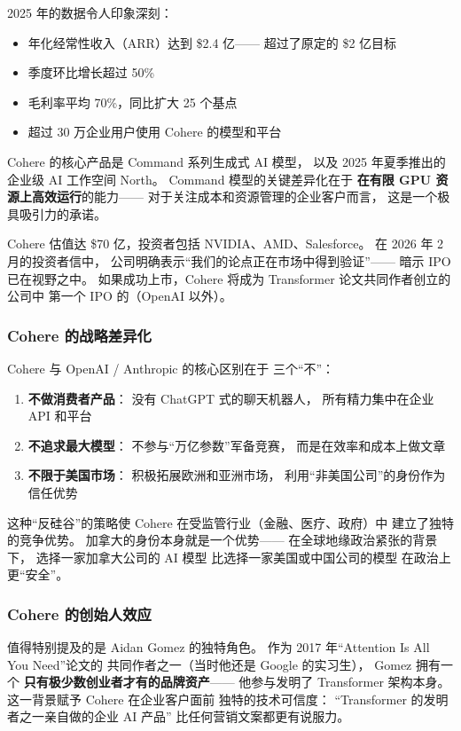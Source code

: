 2025 年的数据令人印象深刻：
\begin{itemize}[noitemsep]
  \item 年化经常性收入（ARR）达到 \$2.4 亿——
        超过了原定的 \$2 亿目标
  \item 季度环比增长超过 50\%
  \item 毛利率平均 70\%，同比扩大 25 个基点
  \item 超过 30 万企业用户使用 Cohere 的模型和平台
\end{itemize}

Cohere 的核心产品是 Command 系列生成式 AI 模型，
以及 2025 年夏季推出的企业级 AI 工作空间 North。
Command 模型的关键差异化在于
\textbf{在有限 GPU 资源上高效运行}的能力——
对于关注成本和资源管理的企业客户而言，
这是一个极具吸引力的承诺。

Cohere 估值达 \$70 亿，投资者包括 NVIDIA、AMD、Salesforce。
在 2026 年 2 月的投资者信中，
公司明确表示``我们的论点正在市场中得到验证''——
暗示 IPO 已在视野之中。
如果成功上市，Cohere 将成为
Transformer 论文共同作者创立的公司中
第一个 IPO 的（OpenAI 以外）。

\subsubsection{Cohere 的战略差异化}

Cohere 与 OpenAI / Anthropic 的核心区别在于
三个``不''：
\begin{enumerate}[noitemsep]
  \item \textbf{不做消费者产品}：
        没有 ChatGPT 式的聊天机器人，
        所有精力集中在企业 API 和平台
  \item \textbf{不追求最大模型}：
        不参与``万亿参数''军备竞赛，
        而是在效率和成本上做文章
  \item \textbf{不限于美国市场}：
        积极拓展欧洲和亚洲市场，
        利用``非美国公司''的身份作为信任优势
\end{enumerate}

这种``反硅谷''的策略使 Cohere
在受监管行业（金融、医疗、政府）中
建立了独特的竞争优势。
加拿大的身份本身就是一个优势——
在全球地缘政治紧张的背景下，
选择一家加拿大公司的 AI 模型
比选择一家美国或中国公司的模型
在政治上更``安全''。

\subsubsection{Cohere 的创始人效应}

值得特别提及的是 Aidan Gomez 的独特角色。
作为 2017 年``Attention Is All You Need''论文的
共同作者之一（当时他还是 Google 的实习生），
Gomez 拥有一个
\textbf{只有极少数创业者才有的品牌资产}——
他参与发明了 Transformer 架构本身。
这一背景赋予 Cohere 在企业客户面前
独特的技术可信度：
``Transformer 的发明者之一亲自做的企业 AI 产品''
比任何营销文案都更有说服力。

